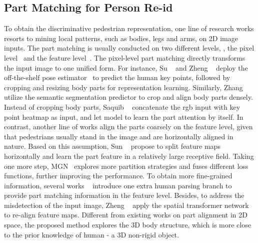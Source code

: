 \subsection{Part Matching for Person Re-id}
To obtain the discriminative pedestrian representation, one line of research works resorts to mining local patterns, such as bodies, legs and arms, on 2D image inputs. The part matching is usually conducted on two different levels, \ie, the pixel level~\cite{su2017pose,zhang2019densely,zheng2019pose} and the feature level~\cite{sun2017beyond,wang2018learning}. 
The pixel-level part matching directly transforms the input image to one unified form. For instance, Su \etal~\cite{su2017pose} and Zheng \etal~\cite{zheng2019pose} deploy the off-the-shelf pose estimator~\cite{wei2016convolutional} to predict the human key points, followed by cropping and resizing body parts for representation learning. Similarly, Zhang \etal~\cite{zhang2019densely} utilize the semantic segmentation predictor to crop and align body parts densely. Instead of cropping body parts, Saquib \etal~\cite{saquib2018pose} concatenate the rgb input with key point heatmap as input, and let model to learn the part attention by itself.
In contrast, another line of works align the parts coarsely on the feature level, given that pedestrians usually stand in the image and are horizontally aligned in nature. Based on this assumption, Sun \etal~\cite{sun2017beyond,sun2019learning} propose to split feature 
maps horizontally and learn the part feature in a relatively large receptive field. Taking one more step, MGN~\cite{wang2018learning} explores more partition strategies and fuses different loss functions, further improving the performance. 
To obtain more fine-grained information, several works \etal~\cite{kalayeh2018human,suh2018part,gao2020pose,miao2019pose,lanmagnifiernet} introduce one extra human parsing branch to provide part matching information in the feature level. Besides, to address the misdetection of the input image, Zheng \etal~\cite{zheng2017pedestrian} apply the spatial transformer network~\cite{jaderberg2015spatial} to re-align feature maps. Different from existing works on part alignment in 2D space, the proposed method explores the 3D body structure, which is more close to the prior knowledge of human - a 3D non-rigid object. 

